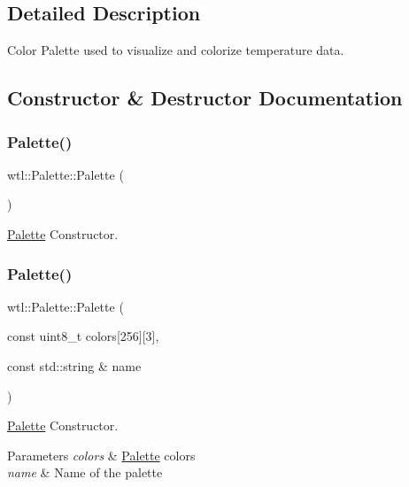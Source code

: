 \subsection{Detailed Description}
Color Palette used to visualize and colorize temperature data. 

\subsection{Constructor \& Destructor Documentation}
\mbox{\label{classwtl_1_1_palette_a2f21d53e90f3f40124b9733d22caa7cc}} 
\subsubsection{\texorpdfstring{Palette()}{Palette()}\hspace{0.1cm}{\footnotesize\ttfamily [1/3]}}
{\footnotesize\ttfamily wtl\+::\+Palette\+::\+Palette (\begin{DoxyParamCaption}{ }\end{DoxyParamCaption})}



\hyperlink{classwtl_1_1_palette}{Palette} Constructor. 

\mbox{\label{classwtl_1_1_palette_a2eff6c10703b35c0ec6329484e4bea7b}} 
\subsubsection{\texorpdfstring{Palette()}{Palette()}\hspace{0.1cm}{\footnotesize\ttfamily [2/3]}}
{\footnotesize\ttfamily wtl\+::\+Palette\+::\+Palette (\begin{DoxyParamCaption}\item[{const uint8\+\_\+t}]{colors\mbox{[}256\mbox{]}\mbox{[}3\mbox{]},  }\item[{const std\+::string \&}]{name }\end{DoxyParamCaption})}



\hyperlink{classwtl_1_1_palette}{Palette} Constructor. 


\begin{DoxyParams}{Parameters}
{\em colors} & \hyperlink{classwtl_1_1_palette}{Palette} colors \\
\hline
{\em name} & Name of the palette \\
\hline
\end{DoxyParams}
\mbox{\label{classwtl_1_1_palette_af7193734230ccde8a33e9ad07f035e98}} 
